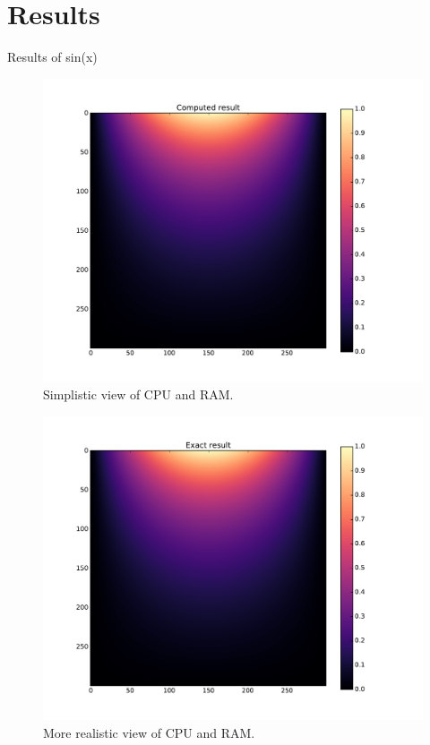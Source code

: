 \section{Results}



Results of sin(x)

	\begin{figure}[h]
	\includegraphics[width=1.1\linewidth]{sin300_calc.pdf}
	\caption{Simplistic view of CPU and RAM.} \label{fig:1a}
	\end{figure}
	\begin{figure}
	\includegraphics[width=1.1\linewidth]{sin300_exact.pdf}
	\caption{More realistic view of CPU and RAM.} \label{fig:1b}
	\end{figure}
